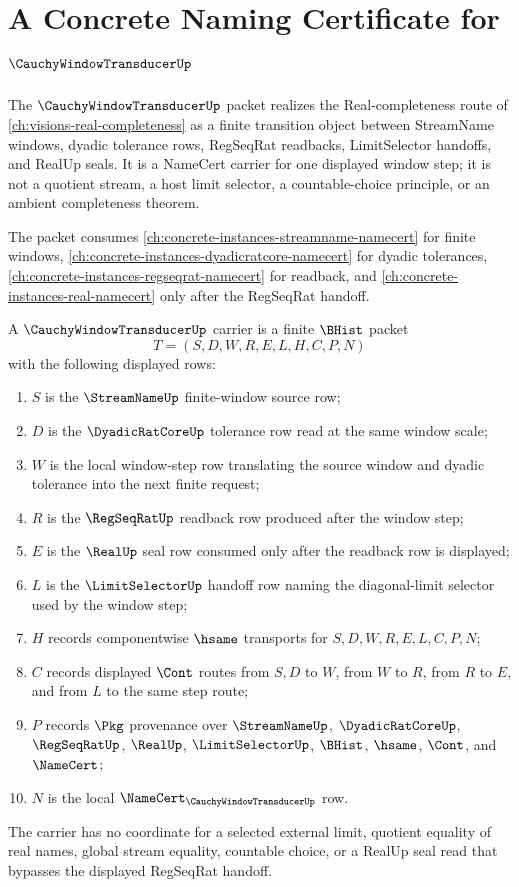 \chapter{A Concrete Naming Certificate for $\CauchyWindowTransducerUp$}
\label{ch:concrete-instances-cauchy-window-transducer-namecert}

The $\CauchyWindowTransducerUp$ packet realizes the Real-completeness route of \autoref{ch:visions-real-completeness} as a finite transition object between StreamName windows, dyadic tolerance rows, RegSeqRat readbacks, LimitSelector handoffs, and RealUp seals. It is a NameCert carrier for one displayed window step; it is not a quotient stream, a host limit selector, a countable-choice principle, or an ambient completeness theorem.

The packet consumes \autoref{ch:concrete-instances-streamname-namecert} for finite windows, \autoref{ch:concrete-instances-dyadicratcore-namecert} for dyadic tolerances, \autoref{ch:concrete-instances-regseqrat-namecert} for readback, and \autoref{ch:concrete-instances-real-namecert} only after the RegSeqRat handoff.

\begin{definition}
\label{def:cauchy-window-transducer-carrier}
A $\CauchyWindowTransducerUp$ carrier is a finite $\BHist$ packet
$$
T=(S,D,W,R,E,L,H,C,P,N)
$$
with the following displayed rows:
\begin{enumerate}
\item $S$ is the $\StreamNameUp$ finite-window source row;
\item $D$ is the $\DyadicRatCoreUp$ tolerance row read at the same window scale;
\item $W$ is the local window-step row translating the source window and dyadic tolerance into the next finite request;
\item $R$ is the $\RegSeqRatUp$ readback row produced after the window step;
\item $E$ is the $\RealUp$ seal row consumed only after the readback row is displayed;
\item $L$ is the $\LimitSelectorUp$ handoff row naming the diagonal-limit selector used by the window step;
\item $H$ records componentwise $\hsame$ transports for $S,D,W,R,E,L,C,P,N$;
\item $C$ records displayed $\Cont$ routes from $S,D$ to $W$, from $W$ to $R$, from $R$ to $E$, and from $L$ to the same step route;
\item $P$ records $\Pkg$ provenance over $\StreamNameUp$, $\DyadicRatCoreUp$, $\RegSeqRatUp$, $\RealUp$, $\LimitSelectorUp$, $\BHist$, $\hsame$, $\Cont$, and $\NameCert$;
\item $N$ is the local $\NameCert_{\CauchyWindowTransducerUp}$ row.
\end{enumerate}
The carrier has no coordinate for a selected external limit, quotient equality of real names, global stream equality, countable choice, or a RealUp seal read that bypasses the displayed RegSeqRat handoff.
\end{definition}

